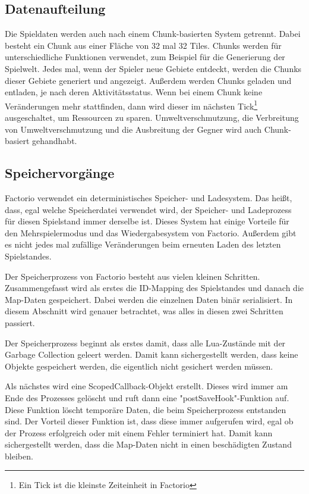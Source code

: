\subsection{Datenaufteilung} \label{ssec:factorioDatenaufteilung}
Die Spieldaten werden auch nach einem Chunk-basierten System getrennt. Dabei besteht ein Chunk aus einer Fläche von 32 mal 32 Tiles. Chunks werden für unterschiedliche Funktionen verwendet, zum Beispiel für die Generierung der Spielwelt. Jedes mal, wenn der Spieler neue Gebiete entdeckt, werden die Chunks dieser Gebiete generiert und angezeigt. Außerdem werden Chunks geladen und entladen, je nach deren Aktivitätsstatus. Wenn bei einem Chunk keine Veränderungen mehr stattfinden, dann wird dieser im nächsten Tick\footnote{Ein Tick ist die kleinste Zeiteinheit in Factorio\cite{factorioTime}} ausgeschaltet, um Ressourcen zu sparen. Umweltverschmutzung, die Verbreitung von Umweltverschmutzung und die Ausbreitung der Gegner wird auch Chunk-basiert gehandhabt. 
\cite{factorioMapStructure}



\subsection{Speichervorgänge}
Factorio verwendet ein deterministisches Speicher- und Ladesystem. Das heißt, dass, egal welche Speicherdatei verwendet wird, der Speicher- und Ladeprozess für diesen Spielstand immer derselbe ist. Dieses System hat einige Vorteile für den Mehrspielermodus und das Wiedergabesystem von Factorio. Außerdem gibt es nicht jedes mal zufällige Veränderungen beim erneuten Laden des letzten Spielstandes.\cite{factorioGithubSaveLoad}

Der Speicherprozess von Factorio besteht aus vielen kleinen Schritten. Zusammengefasst wird als erstes die ID-Mapping des Spielstandes und danach die Map-Daten gespeichert.
\cite{factorioFridayFacts270} Dabei werden die einzelnen Daten binär serialisiert.\cite{factorioGithubSaveLoad} In diesem Abschnitt wird genauer betrachtet, was alles in diesen zwei Schritten passiert. 

Der Speicherprozess beginnt als erstes damit, dass alle Lua-Zustände mit der Garbage Collection geleert werden. Damit kann sichergestellt werden, dass keine Objekte gespeichert werden, die eigentlich nicht gesichert werden müssen.\cite{factorioGithubSaveLoad}

Als nächstes wird eine ScopedCallback-Objekt erstellt. Dieses wird immer am Ende des Prozesses gelöscht und ruft dann eine "postSaveHook"-Funktion auf. Diese Funktion löscht temporäre Daten, die beim Speicherprozess entstanden sind. Der Vorteil dieser Funktion ist, dass diese immer aufgerufen wird, egal ob der Prozess erfolgreich oder mit einem Fehler terminiert hat. Damit kann sichergestellt werden, dass die Map-Daten nicht in einen beschädigten Zustand bleiben.\cite{factorioGithubSaveLoad}


